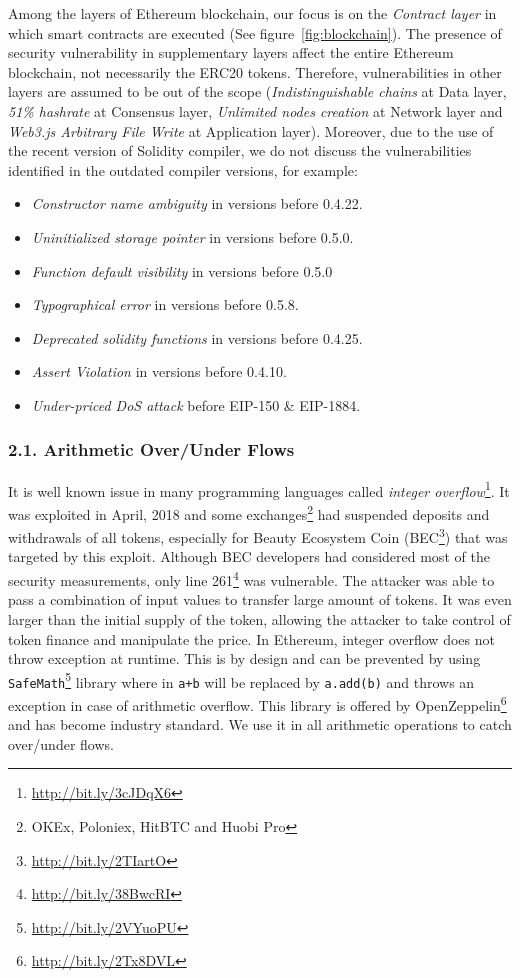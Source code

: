 Among the layers of Ethereum blockchain, our focus is on the \textit{Contract layer} in which smart contracts are executed (See figure~\ref{fig:blockchain}). The presence of security vulnerability in supplementary layers affect the entire Ethereum blockchain, not necessarily the ERC20 tokens. Therefore, vulnerabilities in other layers are assumed to be out of the scope (\eg \textit{Indistinguishable chains} at Data layer, \textit{51\% hashrate} at Consensus layer, \textit{Unlimited nodes creation} at Network layer and \textit{Web3.js Arbitrary File Write} at Application layer). Moreover, due to the use of the recent version of Solidity compiler, we do not discuss the vulnerabilities identified in the outdated compiler versions, for example:
\begin{itemize}[leftmargin=*]
	\item \textit{Constructor name ambiguity} in versions before 0.4.22.
	\item \textit{Uninitialized storage pointer} in versions before 0.5.0.
	\item \textit{Function default visibility} in versions before 0.5.0
	\item \textit{Typographical error} in versions before 0.5.8.
	\item \textit{Deprecated solidity functions} in versions before 0.4.25.
	\item \textit{Assert Violation} in versions before 0.4.10.
	\item \textit{Under-priced DoS attack} before EIP-150 \& EIP-1884.
\end{itemize}

\subsubsection*{2.1. Arithmetic Over/Under Flows}
It is well known issue in many programming languages called \textit{integer overflow}\footnote{\url{http://bit.ly/3cJDqX6}}. It was exploited in April, 2018 and some exchanges\footnote{OKEx, Poloniex, HitBTC and Huobi Pro} had suspended deposits and withdrawals of all tokens, especially for Beauty Ecosystem Coin (BEC\footnote{\url{http://bit.ly/2TIartO}}) that was targeted by this exploit. Although BEC developers had considered most of the security measurements, only line 261\footnote{\url{http://bit.ly/38BwcRI}} was vulnerable\cite{PeckShield}. The attacker was able to pass a combination of input values to transfer large amount of tokens\cite{Overflow}. It was even larger than the initial supply of the token, allowing the attacker to take control of token finance and manipulate the price. In Ethereum, integer overflow does not throw exception at runtime. This is by design and can be prevented by using \texttt{SafeMath}\footnote{\url{http://bit.ly/2VYuoPU}} library where in \texttt{a+b} will be replaced by \texttt{a.add(b)} and throws an exception in case of arithmetic overflow. This library is offered by OpenZeppelin\footnote{\url{http://bit.ly/2Tx8DVL}} and has become industry standard. We use it in all arithmetic operations to catch over/under flows.

